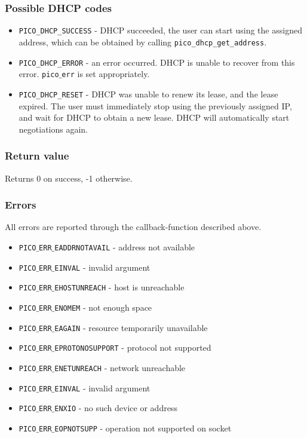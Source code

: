 \subsubsection*{Possible DHCP codes}
\begin{itemize}[noitemsep]
\item \texttt{PICO\_DHCP\_SUCCESS} - DHCP succeeded, the user can start using the assigned address, which can be obtained by calling \texttt{pico\_dhcp\_get\_address}.
\item \texttt{PICO\_DHCP\_ERROR} - an error occurred. DHCP is unable to recover from this error. \texttt{pico$\_$err} is set appropriately.
\item \texttt{PICO\_DHCP\_RESET} - DHCP was unable to renew its lease, and the lease expired. The user must immediately stop using the previously assigned IP, and wait for DHCP to obtain a new lease. DHCP will automatically start negotiations again.
\end{itemize}

\subsubsection*{Return value}
Returns 0 on success, -1 otherwise.

\subsubsection*{Errors}   %
All errors are reported through the callback-function described above.
\begin{itemize}[noitemsep]
\item \texttt{PICO$\_$ERR$\_$EADDRNOTAVAIL} - address not available		%
\item \texttt{PICO$\_$ERR$\_$EINVAL} - invalid argument
\item \texttt{PICO$\_$ERR$\_$EHOSTUNREACH} - host is unreachable
\item \texttt{PICO$\_$ERR$\_$ENOMEM} - not enough space
\item \texttt{PICO$\_$ERR$\_$EAGAIN} - resource temporarily unavailable
\item \texttt{PICO$\_$ERR$\_$EPROTONOSUPPORT} - protocol not supported	%
\item \texttt{PICO$\_$ERR$\_$ENETUNREACH} - network unreachable 
\item \texttt{PICO$\_$ERR$\_$EINVAL} - invalid argument					%
\item \texttt{PICO$\_$ERR$\_$ENXIO} - no such device or address
\item \texttt{PICO$\_$ERR$\_$EOPNOTSUPP} - operation not supported on socket
\end{itemize}

